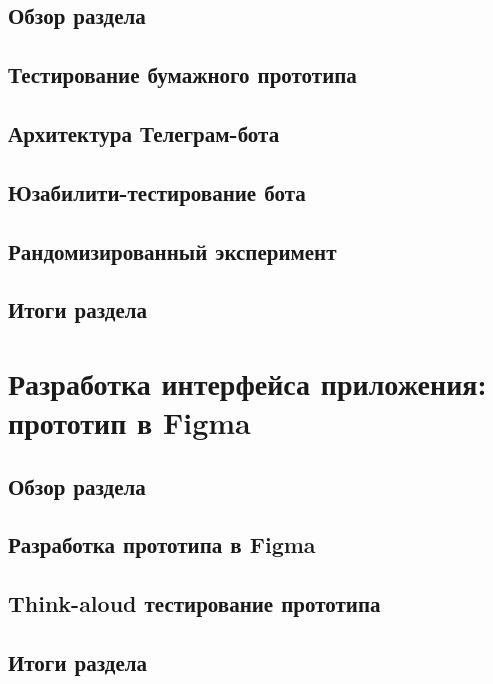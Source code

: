 \documentclass[pdflatex,sn-mathphys-num]{sn-jnl}%
\theoremstyle{thmstyleone}%
\theoremstyle{thmstyletwo}%
\theoremstyle{thmstylethree}%
\begin{document}
\subsection{Обзор раздела}

\subsection{Тестирование бумажного прототипа}

\subsection{Архитектура Телеграм-бота}

\subsection{Юзабилити-тестирование бота}

\subsection{Рандомизированный эксперимент}

\subsection{Итоги раздела}

\section{Разработка интерфейса приложения: прототип в Figma}

\subsection{Обзор раздела}

\subsection{Разработка прототипа в Figma}

\subsection{Think-aloud тестирование прототипа}

\subsection{Итоги раздела}
\end{document}
